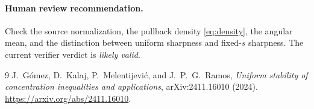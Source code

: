 \documentclass[11pt]{article}
\begin{document}
\paragraph{Human review recommendation.}
Check the source normalization, the pullback density
\eqref{eq:density}, the angular mean, and the distinction between uniform
sharpness and fixed-\(s\) sharpness. The current verifier verdict is
\emph{likely valid}.

\begin{thebibliography}{9}
J.~Gómez, D.~Kalaj, P.~Melentijević, and J.~P.~G.~Ramos,
\emph{Uniform stability of concentration inequalities and applications},
arXiv:2411.16010 (2024).
\url{https://arxiv.org/abs/2411.16010}.
\end{thebibliography}
\end{document}
